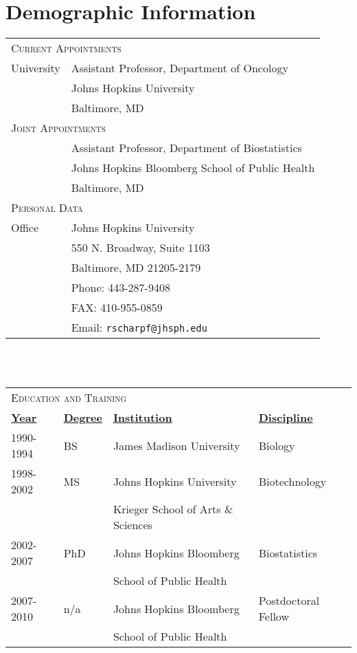 \documentclass[11pt]{article}%
\begin{document}
\section*{\sc Demographic Information}
\begin{tabular}{ll}
\multicolumn{2}{l}{\large \textsc{Current Appointments}}\\
University\hspace{3em} & Assistant Professor, Department of Oncology\\
           & Johns Hopkins University\\
           & Baltimore, MD\\[3pt]
\multicolumn{2}{l}{\textsc{Joint Appointments}}\\
           & Assistant Professor, Department of Biostatistics \\
           & Johns Hopkins Bloomberg School of Public Health\\
           & Baltimore, MD\\[3pt]
\multicolumn{2}{l}{\large \textsc{Personal Data}}\\
Office\hspace{3em} & Johns Hopkins University\\
& 550 N. Broadway, Suite 1103\\
& Baltimore, MD 21205-2179\\
& Phone: 443-287-9408\\
& FAX: 410-955-0859\\
& Email: \texttt{rscharpf@jhsph.edu}\\
\end{tabular}\\
\vspace{1em}\\
\begin{tabular}{llll}
\multicolumn{4}{l}{\large \textsc{Education and Training}}\\
\bf \underline{Year} & \bf \underline{Degree} & \bf \underline{Institution} & \bf \underline{Discipline} \\
1990-1994 & BS & James Madison University & Biology\\
1998-2002 & MS & Johns Hopkins University & Biotechnology\\
          &    & Krieger School of Arts \& Sciences&\\
2002-2007 & PhD& Johns Hopkins Bloomberg& Biostatistics\\
          &    & School of Public Health& \\
2007-2010 & n/a& Johns Hopkins Bloomberg& Postdoctoral Fellow\\
          &    & School of Public Health& \\
\end{tabular}\\
\end{document}
